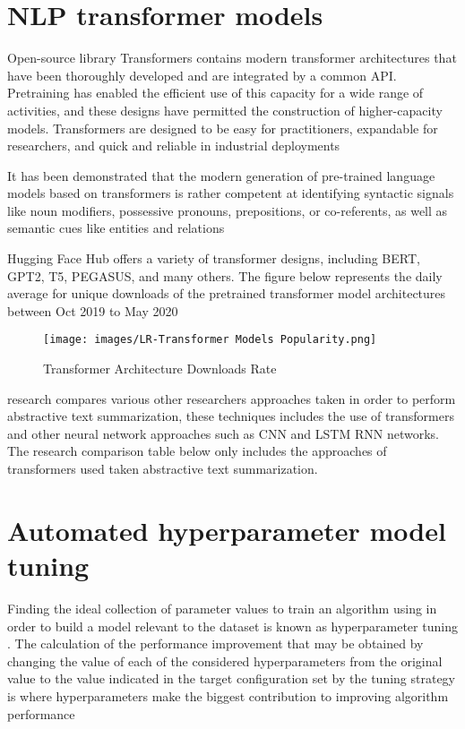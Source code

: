 \documentclass[manuscript,screen,natbib=false]{acmart}
\begin{document}
\section{NLP transformer models}

Open-source library Transformers contains modern transformer architectures that have been thoroughly developed and are integrated by a common API. Pretraining has enabled the efficient use of this capacity for a wide range of activities, and these designs have permitted the construction of higher-capacity models. Transformers are designed to be easy for practitioners, expandable for researchers, and quick and reliable in industrial deployments \cite{wolf__2020}

It has been demonstrated that the modern generation of pre-trained language models based on transformers is rather competent at identifying syntactic signals like noun modifiers, possessive pronouns, prepositions, or co-referents, as well as semantic cues like entities and relations \cite{brasoveanu_andonie_2020}

Hugging Face Hub offers a variety of transformer designs, including BERT, GPT2, T5, PEGASUS, and many others. The figure below represents the daily average for unique downloads of the pretrained transformer model architectures between Oct 2019 to May 2020 \cite{wolf__2020}

\begin{figure}[h]
\centering
\texttt{[image: images/LR-Transformer Models Popularity.png]}
\caption{Transformer Architecture Downloads Rate \cite{wolf__2020}}
\label{fig:transformer-architecture-model-popularity}
\end{figure}

\cite{etemad_abidi_chhabra_2021} research compares various other researchers approaches taken in order to perform abstractive text summarization, these techniques includes the use of transformers and other neural network approaches such as CNN and LSTM RNN networks. The research comparison table below only includes the approaches of transformers used taken abstractive text summarization.

\section{Automated hyperparameter model tuning}

Finding the ideal collection of parameter values to train an algorithm using in order to build a model relevant to the dataset is known as hyperparameter tuning \cite{liu_wang_2021}. The calculation of the performance improvement that may be obtained by changing the value of each of the considered hyperparameters from the original value to the value indicated in the target configuration set by the tuning strategy is where hyperparameters make the biggest contribution to improving algorithm performance \cite{joy_selvan_2022}
\end{document}
